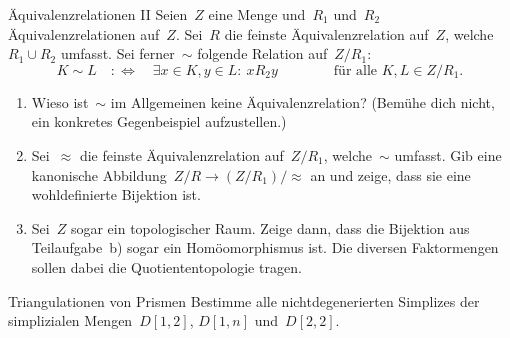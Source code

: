 \documentclass{uebblatt}
\begin{document}
\begin{aufgabe}{Äquivalenzrelationen II}
Seien~$Z$ eine Menge und~$R_1$ und~$R_2$ Äquivalenzrelationen auf~$Z$.
Sei~$R$ die feinste Äquivalenzrelation auf~$Z$, welche~$R_1 \cup R_2$ umfasst.
Sei ferner~$\sim$ folgende Relation auf~$Z/R_1$:
\[ K \sim L \quad:\Longleftrightarrow\quad
  \exists x \in K, y \in L{:}\ x R_2 y \qquad\qquad\text{für alle~$K,L \in
  Z/R_1$.} \]

\begin{enumerate}
\item Wieso ist~$\sim$ im Allgemeinen keine Äquivalenzrelation? (Bemühe dich
nicht, ein konkretes Gegenbeispiel aufzustellen.)
\item Sei~$\approx$ die feinste Äquivalenzrelation auf~$Z/R_1$, welche~$\sim$
umfasst. Gib eine kanonische Abbildung~$Z/R \to (Z/R_1)/{\approx}$ an und zeige,
dass sie eine wohldefinierte Bijektion ist.
\item Sei~$Z$ sogar ein topologischer Raum. Zeige dann, dass die Bijektion aus
Teilaufgabe~b) sogar ein Homöomorphismus ist. Die diversen Faktormengen
sollen dabei die Quotiententopologie tragen.
\end{enumerate}
\end{aufgabe}


\begin{aufgabe}{Triangulationen von Prismen}
Bestimme alle nichtdegenerierten Simplizes der simplizialen Mengen~$D[1,2]$,
$D[1,n]$ und~$D[2,2]$.
\end{aufgabe}
\end{document}
